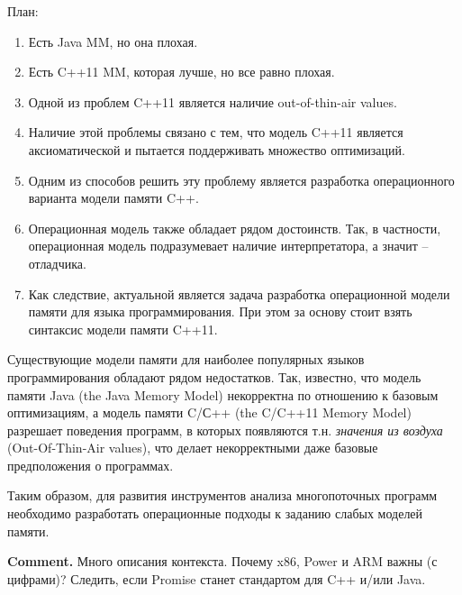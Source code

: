 План:
\begin{enumerate}
\item Есть Java MM, но она плохая.
\item Есть C++11 MM, которая лучше, но все равно плохая.
\item Одной из проблем C++11 является наличие out-of-thin-air values.
\item Наличие этой проблемы связано с тем, что модель C++11 является аксиоматической
      и пытается поддерживать множество оптимизаций.
\item Одним из способов решить эту проблему является разработка операционного варианта
      модели памяти C++.
\item Операционная модель также обладает рядом достоинств. Так, в частности, операционная
      модель подразумевает наличие интерпретатора, а значит -- отладчика.
\item Как следствие, актуальной является задача разработка операционной модели памяти
      для языка программирования. При этом за основу стоит взять синтаксис модели памяти C++11.
\end{enumerate}

Существующие модели памяти для наиболее популярных языков программирования обладают рядом недостатков.
Так, известно, что модель памяти Java (the Java Memory Model) некорректна по отношению
к базовым оптимизациям, а модель памяти C/С++ (the C/C++11 Memory Model) разрешает
поведения программ, в которых появляются т.н. \emph{значения из воздуха} (Out-Of-Thin-Air values),
что делает некорректными даже базовые предположения о программах.

Таким образом, для развития инструментов анализа многопоточных программ необходимо
разработать операционные подходы к заданию слабых моделей памяти.

\textbf{Comment.} Много описания контекста. Почему x86, Power и ARM важны (с цифрами)?
Следить, если Promise станет стандартом для C++ и/или Java.


